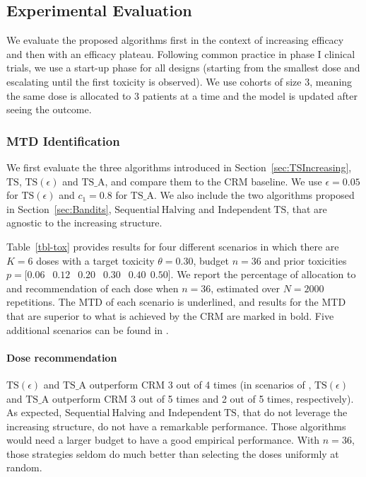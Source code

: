 \subsection{Experimental Evaluation}\label{sec:Experiments}

We evaluate the proposed algorithms first in the context of increasing efficacy and then with an efficacy plateau.
Following common practice in phase I clinical trials, we use a start-up phase for all designs (starting from the smallest dose and escalating until the first toxicity is observed).
We use cohorts of size 3, meaning the same dose is allocated to 3 patients at a time and the model is updated after seeing the outcome. 



\subsubsection{MTD Identification}
We first evaluate the three algorithms introduced in Section~\ref{sec:TSIncreasing}, $\mathrm{TS}$, $\mathrm{TS}(\epsilon)$ and $\mathrm{TS}\_\mathrm{A}$, and compare them to the $\mathrm{CRM}$ baseline. We use $\epsilon = 0.05$ for $\mathrm{TS}(\epsilon)$ and $c_1 = 0.8$ for $\mathrm{TS}\_\mathrm{A}$. We also include the two algorithms proposed in Section~\ref{sec:Bandits}, $\mathrm{Sequential \ Halving}$ and
 $\mathrm{Independent \ TS}$, that are agnostic to the increasing structure. 
 
Table~\ref{tbl-tox} provides results for four different scenarios in which there are $K=6$ doses with a target toxicity $\theta = 0.30$, budget $n=36$ and prior toxicities $p = [0.06$ $\ \ 0.12$ $\ \ 0.20$ $\ \ 0.30$ $\ \ 0.40 \ \ 0.50]$.
We report the percentage of allocation to and recommendation of each dose when $n=36$, estimated over $N=2000$ repetitions.
The MTD of each scenario is underlined, and results for the MTD that are superior to what is achieved by the CRM are marked in bold. Five additional scenarios can be found in .

\paragraph{Dose recommendation}  $\mathrm{TS}(\epsilon)$ and $\mathrm{TS}\_\mathrm{A}$ outperform CRM 3 out of 4 times (in scenarios of , $\mathrm{TS}(\epsilon)$ and $\mathrm{TS}\_\mathrm{A}$ outperform CRM 3 out of 5 times and 2 out of 5 times, respectively). As expected, $\mathrm{Sequential \ Halving}$ and
 $\mathrm{Independent \ TS}$, that do not leverage the increasing structure, do not have a remarkable performance. Those algorithms would need a larger budget to have a good empirical performance. With $n=36$, those strategies seldom do much better than selecting the doses uniformly at random.  

